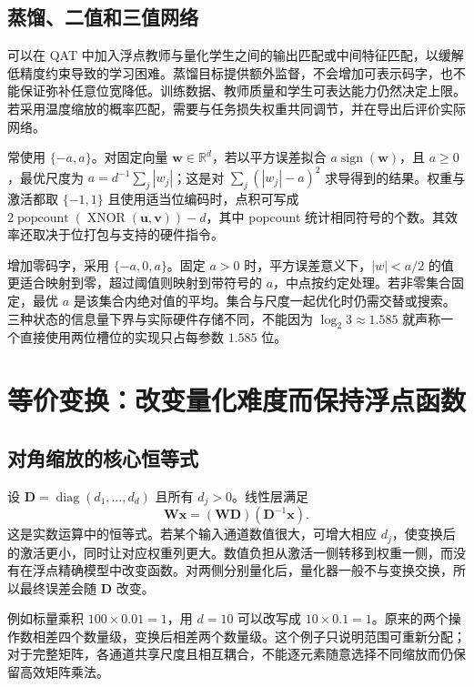 \documentclass[UTF8,12pt,a4paper,fontset=fandol]{ctexart}
\begin{document}
\subsection{蒸馏、二值和三值网络}
可以在 QAT 中加入浮点教师与量化学生之间的输出匹配或中间特征匹配，以缓解低精度约束导致的学习困难。蒸馏目标提供额外监督，不会增加可表示码字，也不能保证弥补任意位宽降低。训练数据、教师质量和学生可表达能力仍然决定上限。若采用温度缩放的概率匹配，需要与任务损失权重共同调节，并在导出后评价实际网络。

常使用 $\{-a,a\}$。对固定向量 $\mathbf w\in\mathbb R^d$，若以平方误差拟合 $a\operatorname{sign}(\mathbf w)$，且 $a\geq0$，最优尺度为 $a=d^{-1}\sum_j|w_j|$；这是对 $\sum_j(|w_j|-a)^2$ 求导得到的结果。权重与激活都取 $\{-1,1\}$ 且使用适当位编码时，点积可写成 $2\operatorname{popcount}(\operatorname{XNOR}(\mathbf u,\mathbf v))-d$，其中 popcount 统计相同符号的个数。其效率还取决于位打包与支持的硬件指令。

增加零码字，采用 $\{-a,0,a\}$。固定 $a>0$ 时，平方误差意义下，$|w|<a/2$ 的值更适合映射到零，超过阈值则映射到带符号的 $a$，中点按约定处理。若非零集合固定，最优 $a$ 是该集合内绝对值的平均。集合与尺度一起优化时仍需交替或搜索。三种状态的信息量下界与实际硬件存储不同，不能因为 $\log_2 3\approx1.585$ 就声称一个直接使用两位槽位的实现只占每参数 $1.585$ 位。

\section{等价变换：改变量化难度而保持浮点函数}
\label{sec:quant-transform}

\subsection{对角缩放的核心恒等式}
设 $\mathbf D=\operatorname{diag}(d_1,\ldots,d_d)$ 且所有 $d_j>0$。线性层满足
\begin{equation}
 \mathbf W\mathbf x=(\mathbf W\mathbf D)(\mathbf D^{-1}\mathbf x).
 \label{eq:quant-diagonal-transform}
\end{equation}
这是实数运算中的恒等式。若某个输入通道数值很大，可增大相应 $d_j$，使变换后的激活更小，同时让对应权重列更大。数值负担从激活一侧转移到权重一侧，而没有在浮点精确模型中改变函数。对两侧分别量化后，量化器一般不与变换交换，所以最终误差会随 $\mathbf D$ 改变。

例如标量乘积 $100\times0.01=1$，用 $d=10$ 可以改写成 $10\times0.1=1$。原来的两个操作数相差四个数量级，变换后相差两个数量级。这个例子只说明范围可重新分配；对于完整矩阵，各通道共享尺度且相互耦合，不能逐元素随意选择不同缩放而仍保留高效矩阵乘法。
\end{document}
